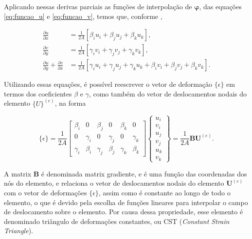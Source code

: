 Aplicando nessas derivas parciais as funções de interpolação de $\bm{\varphi}$, das equações \ref{eq:funcao_u} e \ref{eq:funcao_v}, temos que, conforme ,

\begin{align}
    \frac{\partial u}{\partial x} &= \frac{1}{2A} \left[ \beta_i u_i + \beta_j u_j + \beta_k u_k\right],  \\
    \frac{\partial v}{\partial y} &= \frac{1}{2A} \left[ \gamma_i v_i + \gamma_j v_j + \gamma_k v_k\right],  \\
    \frac{\partial u}{\partial y} + \frac{\partial v}{\partial x} &= \frac{1}{2A} \left[ \gamma_i u_i + \gamma_j u_j + \gamma_k u_k + \beta_i v_i + \beta_j v_j + \beta_k v_k \right].
\end{align}

Utilizando essas equações, é possível reescrever o vetor de deformação $\{\epsilon\}$ em termos dos coeficientes $\beta$ e $\gamma$, como também do vetor de deslocamentos nodais do elemento $\{U\}^{(e)}$, na forma

\begin{equation}
    \{\epsilon\} = \frac{1}{2A} \begin{bmatrix}
        \beta_i & 0 & \beta_j & 0 & \beta_k & 0 \\
        0 & \gamma_i & 0 & \gamma_j & 0 & \gamma_k \\
        \gamma_i & \beta_i & \gamma_j & \beta_j & \gamma_k & \beta_k
    \end{bmatrix} \begin{Bmatrix}
        u_i \\ v_i \\ u_j \\ v_j \\ u_k \\ v_k
    \end{Bmatrix} = \frac{1}{2A} \bm{B} \bm{U}^{(e)}.
    \label{eq:deformacao_deslocamento}
\end{equation}

A matrix $\bm{B}$ é denominada matrix gradiente, e é uma função das coordenadas dos nós do elemento, e relaciona o vetor de deslocamentos nodais do elemento $\bm{U}^{(e)}$ com o vetor de deformações $\{\epsilon\}$, assim como é constante ao longo de todo o elemento, o que é devido pela escolha de funções lineares para interpolar o campo de deslocamento sobre o elemento. Por causa dessa propriedade, esse elemento é denominado triângulo de deformações constantes, ou CST (\emph{Constant Strain Triangle}). \cite{LOGAN}

